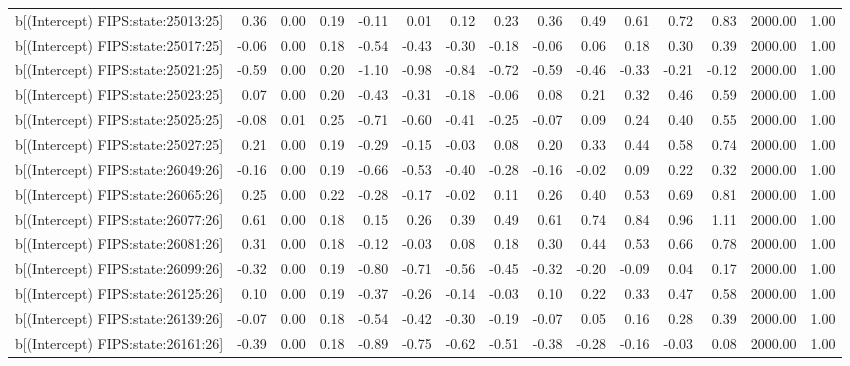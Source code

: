 \begin{table}[ht]
\begin{tabular}{rrrrrrrrrrrrrrr}
  b[(Intercept) FIPS:state:25013:25] & 0.36 & 0.00 & 0.19 & -0.11 & 0.01 & 0.12 & 0.23 & 0.36 & 0.49 & 0.61 & 0.72 & 0.83 & 2000.00 & 1.00 \\ 
  b[(Intercept) FIPS:state:25017:25] & -0.06 & 0.00 & 0.18 & -0.54 & -0.43 & -0.30 & -0.18 & -0.06 & 0.06 & 0.18 & 0.30 & 0.39 & 2000.00 & 1.00 \\ 
  b[(Intercept) FIPS:state:25021:25] & -0.59 & 0.00 & 0.20 & -1.10 & -0.98 & -0.84 & -0.72 & -0.59 & -0.46 & -0.33 & -0.21 & -0.12 & 2000.00 & 1.00 \\ 
  b[(Intercept) FIPS:state:25023:25] & 0.07 & 0.00 & 0.20 & -0.43 & -0.31 & -0.18 & -0.06 & 0.08 & 0.21 & 0.32 & 0.46 & 0.59 & 2000.00 & 1.00 \\ 
  b[(Intercept) FIPS:state:25025:25] & -0.08 & 0.01 & 0.25 & -0.71 & -0.60 & -0.41 & -0.25 & -0.07 & 0.09 & 0.24 & 0.40 & 0.55 & 2000.00 & 1.00 \\ 
  b[(Intercept) FIPS:state:25027:25] & 0.21 & 0.00 & 0.19 & -0.29 & -0.15 & -0.03 & 0.08 & 0.20 & 0.33 & 0.44 & 0.58 & 0.74 & 2000.00 & 1.00 \\ 
  b[(Intercept) FIPS:state:26049:26] & -0.16 & 0.00 & 0.19 & -0.66 & -0.53 & -0.40 & -0.28 & -0.16 & -0.02 & 0.09 & 0.22 & 0.32 & 2000.00 & 1.00 \\ 
  b[(Intercept) FIPS:state:26065:26] & 0.25 & 0.00 & 0.22 & -0.28 & -0.17 & -0.02 & 0.11 & 0.26 & 0.40 & 0.53 & 0.69 & 0.81 & 2000.00 & 1.00 \\ 
  b[(Intercept) FIPS:state:26077:26] & 0.61 & 0.00 & 0.18 & 0.15 & 0.26 & 0.39 & 0.49 & 0.61 & 0.74 & 0.84 & 0.96 & 1.11 & 2000.00 & 1.00 \\ 
  b[(Intercept) FIPS:state:26081:26] & 0.31 & 0.00 & 0.18 & -0.12 & -0.03 & 0.08 & 0.18 & 0.30 & 0.44 & 0.53 & 0.66 & 0.78 & 2000.00 & 1.00 \\ 
  b[(Intercept) FIPS:state:26099:26] & -0.32 & 0.00 & 0.19 & -0.80 & -0.71 & -0.56 & -0.45 & -0.32 & -0.20 & -0.09 & 0.04 & 0.17 & 2000.00 & 1.00 \\ 
  b[(Intercept) FIPS:state:26125:26] & 0.10 & 0.00 & 0.19 & -0.37 & -0.26 & -0.14 & -0.03 & 0.10 & 0.22 & 0.33 & 0.47 & 0.58 & 2000.00 & 1.00 \\ 
  b[(Intercept) FIPS:state:26139:26] & -0.07 & 0.00 & 0.18 & -0.54 & -0.42 & -0.30 & -0.19 & -0.07 & 0.05 & 0.16 & 0.28 & 0.39 & 2000.00 & 1.00 \\ 
  b[(Intercept) FIPS:state:26161:26] & -0.39 & 0.00 & 0.18 & -0.89 & -0.75 & -0.62 & -0.51 & -0.38 & -0.28 & -0.16 & -0.03 & 0.08 & 2000.00 & 1.00 \\ 

\end{tabular}
\end{table}
